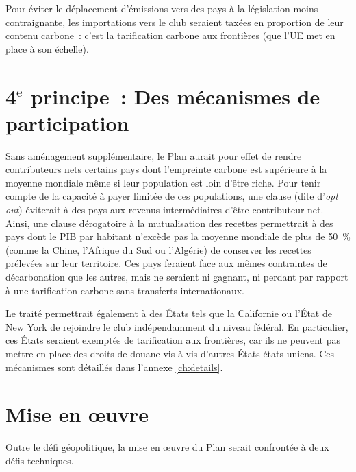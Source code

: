 \documentclass[a5paper,french,openany]{memoir}
\begin{document}

Pour éviter le déplacement d'émissions vers des pays à la législation moins contraignante, les importations vers le 
club seraient taxées en proportion de leur contenu carbone~: c'est la tarification carbone aux frontières (que l'UE met en place à son échelle). 

\section{4$^\text{e}$ principe~: Des mécanismes de participation}

Sans aménagement supplémentaire, le Plan aurait pour effet de rendre contributeurs nets certains pays dont l'empreinte carbone est supérieure à la moyenne mondiale même si leur population est loin d'être riche. Pour tenir compte de la capacité à payer limitée de ces populations, une clause (dite d'\textit{opt out}) éviterait à des pays aux revenus intermédiaires d'être contributeur net. Ainsi, une clause dérogatoire à la mutualisation des recettes permettrait à des pays dont le PIB par habitant n'excède pas la moyenne mondiale de plus de 50~\% (comme la Chine, l'Afrique du Sud ou l'Algérie) de conserver les recettes prélevées sur leur territoire. Ces pays feraient face aux mêmes contraintes de décarbonation que les autres, mais ne seraient ni gagnant, ni perdant par rapport à une tarification carbone sans transferts internationaux. 

Le traité permettrait également à des États tels que la Californie ou l'État de New York de rejoindre le club indépendamment du niveau fédéral. En particulier, ces États seraient exemptés de tarification aux frontières, car ils ne peuvent pas mettre en place des droits de douane vis-à-vis d'autres États états-uniens. 
Ces mécanismes sont détaillés dans l'annexe \ref{ch:details}. 


\section{Mise en œuvre}\label{sec:implementation}
Outre le défi géopolitique, la mise en œuvre du Plan serait confrontée à deux défis techniques. 
\end{document}
